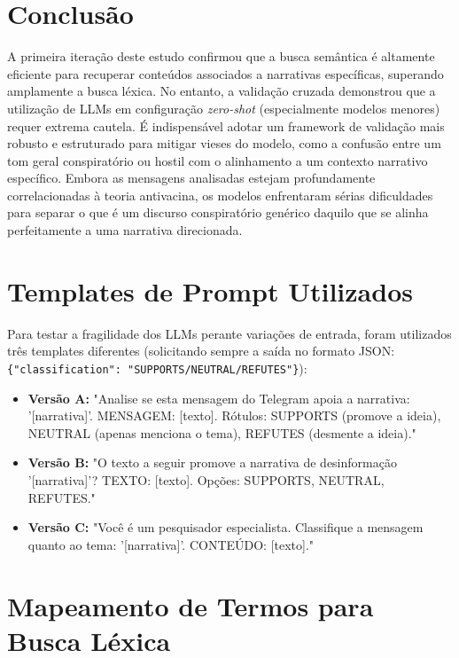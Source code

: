 \documentclass[10pt,twocolumn,a4paper]{article}
\begin{document}
\section{Conclusão}
A primeira iteração deste estudo confirmou que a busca semântica é altamente eficiente para recuperar conteúdos associados a narrativas específicas, superando amplamente a busca léxica. No entanto, a validação cruzada demonstrou que a utilização de LLMs em configuração \textit{zero-shot} (especialmente modelos menores) requer extrema cautela. É indispensável adotar um framework de validação mais robusto e estruturado para mitigar vieses do modelo, como a confusão entre um tom geral conspiratório ou hostil com o alinhamento a um contexto narrativo específico. Embora as mensagens analisadas estejam profundamente correlacionadas à teoria antivacina, os modelos enfrentaram sérias dificuldades para separar o que é um discurso conspiratório genérico daquilo que se alinha perfeitamente a uma narrativa direcionada.

\appendix
\section{Templates de Prompt Utilizados}
\label{app:prompts}

Para testar a fragilidade dos LLMs perante variações de entrada, foram utilizados três templates diferentes (solicitando sempre a saída no formato JSON: \texttt{\{"classification": "SUPPORTS/NEUTRAL/REFUTES"\}}):

\begin{itemize}
    \item \textbf{Versão A:} "Analise se esta mensagem do Telegram apoia a narrativa: '[narrativa]'. MENSAGEM: [texto]. Rótulos: SUPPORTS (promove a ideia), NEUTRAL (apenas menciona o tema), REFUTES (desmente a ideia)."
    \item \textbf{Versão B:} "O texto a seguir promove a narrativa de desinformação '[narrativa]'? TEXTO: [texto]. Opções: SUPPORTS, NEUTRAL, REFUTES."
    \item \textbf{Versão C:} "Você é um pesquisador especialista. Classifique a mensagem quanto ao tema: '[narrativa]'. CONTEÚDO: [texto]."
\end{itemize}

\section{Mapeamento de Termos para Busca Léxica}
\label{app:lexical_terms}
\end{document}
